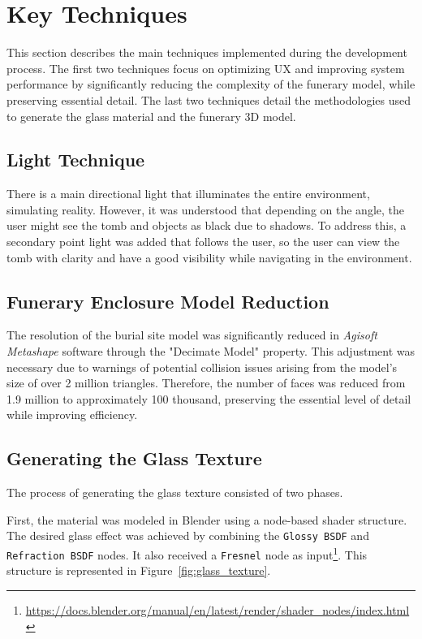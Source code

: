 \section{Key Techniques}
\label{sec:techniques}
This section describes the main techniques implemented during the development process. 
The first two techniques focus on optimizing \gls{UX} and improving system performance by significantly reducing the complexity of the funerary model, while preserving essential detail. 
The last two techniques detail the methodologies used to generate the glass material and the funerary \gls{3D} model.
\subsection{Light Technique}
There is a main directional light that illuminates the entire environment, simulating reality. 
However, it was understood that depending on the angle, the user might see the tomb and objects as black due to shadows. To address this, a secondary point light was added that follows the user, so the user can view the tomb with clarity and have a good visibility while navigating in the environment.

\subsection{Funerary Enclosure Model Reduction}
The resolution of the burial site model was significantly reduced in \emph{Agisoft Metashape} software through the "Decimate Model" property.
This adjustment was necessary due to warnings of potential collision issues arising from the model's size of over 2 million triangles. 
Therefore, the number of faces was reduced from 1.9 million to approximately 100 thousand, preserving the essential level of detail while improving efficiency.

\subsection{Generating the Glass Texture}
\label{sec:glass_texture}
The process of generating the glass texture consisted of two phases.  

First, the material was modeled in Blender using a node-based shader structure. The desired glass effect was achieved by combining the \texttt{Glossy BSDF} and \texttt{Refraction BSDF} nodes. It also received a \texttt{Fresnel} node as input\footnote{\url{https://docs.blender.org/manual/en/latest/render/shader_nodes/index.html}}. This structure is represented in Figure~\ref{fig:glass_texture}.  

